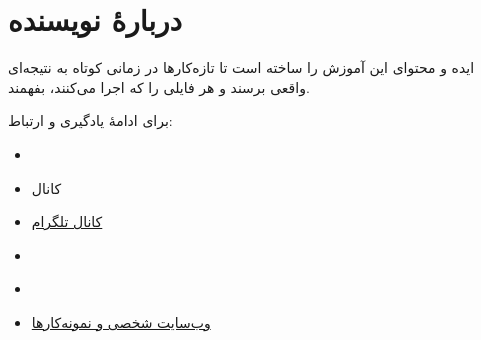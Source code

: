 \documentclass[11pt,openany]{book}
\begin{document}
\mainmatter







\backmatter
\chapter*{دربارهٔ نویسنده}
ایده و محتوای این آموزش را
ساخته است تا تازه‌کارها در زمانی کوتاه به نتیجه‌ای واقعی برسند و هر فایلی را
که اجرا می‌کنند، بفهمند.

برای ادامهٔ یادگیری و ارتباط:
\begin{itemize}
\item \href{https://www.linkedin.com/in/alirezakhajehvandi}{}
\item کانال
\href{https://www.youtube.com/@AlirezaAIES}{}
\item \href{https://t.me/AlirezaAIES}{کانال تلگرام}
\item \href{https://www.instagram.com/alireza.aies}{}
\item \href{https://github.com/alirezaaies}{}
\item \href{https://alirezaaies.github.io/}{وب‌سایت شخصی و نمونه‌کارها}
\end{itemize}
\end{document}
